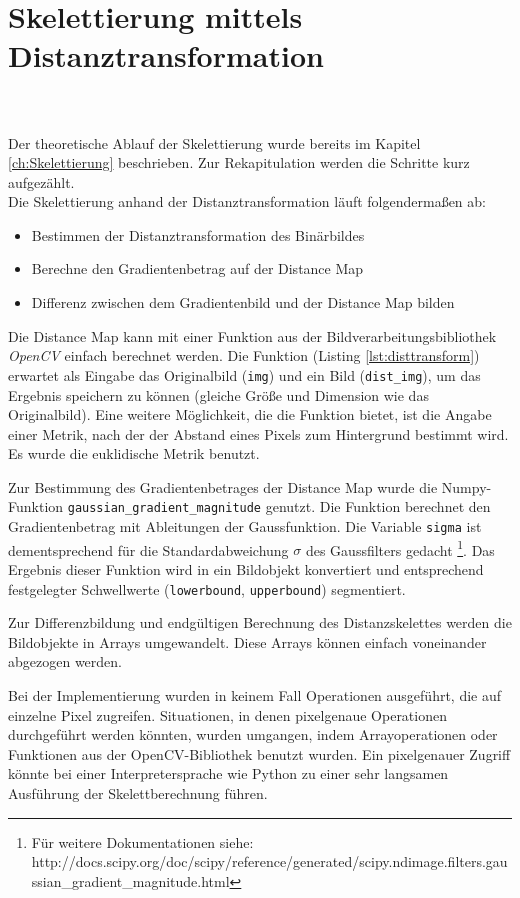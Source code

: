 \section{Skelettierung mittels Distanztransformation}
\\\\
Der theoretische Ablauf der Skelettierung wurde bereits im Kapitel \ref{ch:Skelettierung} beschrieben. Zur
Rekapitulation werden die Schritte kurz aufgezählt. \\
Die Skelettierung anhand der Distanztransformation läuft folgendermaßen ab:
\begin{itemize}
\item Bestimmen der Distanztransformation des Binärbildes
\item Berechne den Gradientenbetrag auf der Distance Map
\item Differenz zwischen dem Gradientenbild und der Distance Map bilden
\end{itemize}
Die Distance Map kann mit einer Funktion aus der Bildverarbeitungsbibliothek \emph{OpenCV} einfach berechnet
werden. Die Funktion (Listing \ref{lst:disttransform}) erwartet als Eingabe das Originalbild (\texttt{img}) und ein Bild (\texttt{dist\_img}), um
das Ergebnis speichern zu können (gleiche Größe und Dimension wie das Originalbild). Eine weitere Möglichkeit, die die Funktion bietet, ist die Angabe einer Metrik, nach der der Abstand eines Pixels zum
Hintergrund bestimmt wird. Es wurde die euklidische Metrik benutzt.

Zur Bestimmung des Gradientenbetrages der Distance Map wurde die Numpy-Funktion \texttt{gaussian\_gradient\_magnitude} genutzt. Die Funktion berechnet den Gradientenbetrag mit Ableitungen
der Gaussfunktion. Die Variable \texttt{sigma} ist dementsprechend für die Standardabweichung $\sigma$ 
des Gaussfilters gedacht \footnote{Für weitere Dokumentationen siehe: http://docs.scipy.org/doc/scipy/reference/generated/scipy.ndimage.filters.gaussian\_gradient\_magnitude.html}. Das Ergebnis dieser Funktion wird in ein Bildobjekt
konvertiert und entsprechend festgelegter Schwellwerte (\texttt{lowerbound}, \texttt{upperbound}) segmentiert.

Zur Differenzbildung und endgültigen Berechnung des Distanzskelettes werden die Bildobjekte in Arrays umgewandelt. 
Diese Arrays können einfach voneinander abgezogen werden. 

Bei der Implementierung wurden in keinem Fall Operationen ausgeführt, die auf einzelne Pixel zugreifen. Situationen, in denen
pixelgenaue Operationen durchgeführt werden könnten, wurden
umgangen, indem Arrayoperationen oder Funktionen aus der
OpenCV-Bibliothek benutzt wurden. Ein pixelgenauer Zugriff
könnte bei einer Interpretersprache wie Python zu einer sehr langsamen
Ausführung der Skelettberechnung führen.